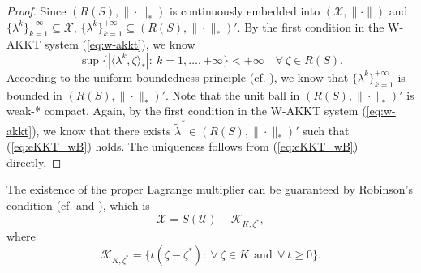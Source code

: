 \documentclass[leqno]{amsart}
\theoremstyle{definition}
\begin{document}
\begin{proof}
Since $(R(S), \|\cdot\|_*)$ is continuously embedded into $(\mathcal{X}, \|\cdot\|)$ and $\{\lambda^k\}_{k=1}^{+\infty}\subseteq \mathcal{X}$,  $\{\lambda^k\}_{k=1}^{+\infty}\subseteq (R(S), \|\cdot\|_*)'$. By the first condition in the W-AKKT system (\ref{eq:w-akkt}), we know
$$ \sup\{|\langle \lambda^k, \zeta\rangle_{*}|:\ k=1,\dots, +\infty\}< +\infty\quad \forall\ \zeta \in R(S).$$
According to the uniform boundedness principle (cf. \cite{sokal2011really}), we know that $\{\lambda^k\}_{k=1}^{+\infty}$ is bounded in $(R(S), \|\cdot\|_*)'$. Note that the unit ball in $(R(S), \|\cdot\|_*)'$ is weak-* compact. Again, by the first condition in the W-AKKT system (\ref{eq:w-akkt}), we know that there exists $\tilde{\lambda}^*\in (R(S), \|\cdot\|_*)'$ such that (\ref{eq:eKKT_wB}) holds. The uniqueness follows from (\ref{eq:eKKT_wB}) directly.
\end{proof}

The existence of the proper Lagrange multiplier can be guaranteed by Robinson's condition (cf. \cite[p. 5]{ito2008lagrange} and \cite{maurer1979first, robinson1976stability, zowe1979regularity}), which is
\begin{equation}\label{eq:RCQ}
\mathcal{X} =  S(\mathcal{U}) - \mathcal{K}_{K,\zeta^*}, 
\end{equation}
where 
$$\mathcal{K}_{K,\zeta^*} = \{t(\zeta - \zeta^*):\ \forall\ \zeta \in K\ \ \mbox{and}\ \ \forall\ t\geq 0\}. $$
\end{document}

